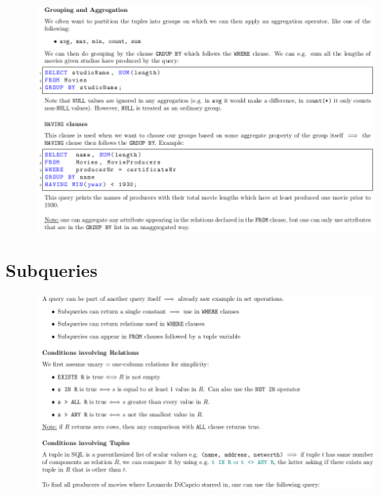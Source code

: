 \documentclass[11pt,oneside,a4paper]{article}
\begin{document}
\vspace{-\topsep}
\begin{figure}[hb!]
	\centering
	\includegraphics[width=1\linewidth]{figures/sql_8}
	\label{fig:sql8}
\end{figure}
\vspace{-\topsep}

\subsection{Subqueries}

\vspace{-\topsep}
\begin{figure}[hb!]
	\centering
	\includegraphics[width=1\linewidth]{figures/sql_9}
	\label{fig:sql9}
\end{figure}
\vspace{-\topsep}

\newpage
\end{document}
